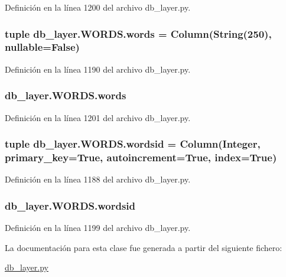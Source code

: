 Definición en la línea 1200 del archivo db\-\_\-layer.\-py.

\hypertarget{classdb__layer_1_1_w_o_r_d_s_adb8240c0cbbcc83b04e6ab5f925d5094}{
\subsubsection[{words}]{\setlength{\rightskip}{0pt plus 5cm}tuple db\-\_\-layer.\-W\-O\-R\-D\-S.\-words = Column(String(250), nullable=False)\hspace{0.3cm}{\ttfamily [static]}}}\label{classdb__layer_1_1_w_o_r_d_s_adb8240c0cbbcc83b04e6ab5f925d5094}


Definición en la línea 1190 del archivo db\-\_\-layer.\-py.

\hypertarget{classdb__layer_1_1_w_o_r_d_s_a71c7bf353b1aebe3e39014792589f31b}{
\subsubsection[{words}]{\setlength{\rightskip}{0pt plus 5cm}db\-\_\-layer.\-W\-O\-R\-D\-S.\-words}}\label{classdb__layer_1_1_w_o_r_d_s_a71c7bf353b1aebe3e39014792589f31b}


Definición en la línea 1201 del archivo db\-\_\-layer.\-py.

\hypertarget{classdb__layer_1_1_w_o_r_d_s_a191b73a99b2cb5624d7b6561ffba1707}{
\subsubsection[{wordsid}]{\setlength{\rightskip}{0pt plus 5cm}tuple db\-\_\-layer.\-W\-O\-R\-D\-S.\-wordsid = Column(Integer, primary\-\_\-key=True, autoincrement=True, index=True)\hspace{0.3cm}{\ttfamily [static]}}}\label{classdb__layer_1_1_w_o_r_d_s_a191b73a99b2cb5624d7b6561ffba1707}


Definición en la línea 1188 del archivo db\-\_\-layer.\-py.

\hypertarget{classdb__layer_1_1_w_o_r_d_s_ae7014f70bc77af166f3649f0bd3c3c71}{
\subsubsection[{wordsid}]{\setlength{\rightskip}{0pt plus 5cm}db\-\_\-layer.\-W\-O\-R\-D\-S.\-wordsid}}\label{classdb__layer_1_1_w_o_r_d_s_ae7014f70bc77af166f3649f0bd3c3c71}


Definición en la línea 1199 del archivo db\-\_\-layer.\-py.



La documentación para esta clase fue generada a partir del siguiente fichero\-:\begin{DoxyCompactItemize}
\item 
\hyperlink{db__layer_8py}{db\-\_\-layer.\-py}\end{DoxyCompactItemize}

